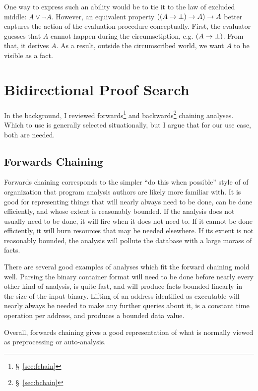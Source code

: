 One way to express such an ability would be to tie it to the law of excluded middle: $A \vee \neg A$.
However, an equivalent property $((A \rightarrow \bot) \rightarrow A) \rightarrow A$ better captures the action of the evaluation procedure conceptually.
First, the evaluator guesses that $A$ cannot happen during the circumsctiption, e.g. $(A \rightarrow \bot)$.
From that, it derives $A$.
As a result, outside the circumscribed world, we want $A$ to be visible as a fact.

\section{Bidirectional Proof Search}
In the background, I reviewed forwards\footnote{\S~\ref{sec:fchain}} and backwards\footnote{\S~\ref{sec:bchain}} chaining analyses.
Which to use is generally selected situationally, but I argue that for our use case, both are needed.
\subsection{Forwards Chaining}
Forwards chaining corresponds to the simpler ``do this when possible'' style of of organization that program analysis authors are likely more familiar with.
It is good for representing things that will nearly always need to be done,
can be done efficiently,
and whose extent is reasonably bounded.
If the analysis does not usually need to be done, it will fire when it does not need to.
If it cannot be done efficiently, it will burn resources that may be needed elsewhere.
If its extent is not reasonably bounded, the analysis will pollute the database with a large morass of facts.

There are several good examples of analyses which fit the forward chaining mold well.
Parsing the binary container format will need to be done before nearly every other kind of analysis, is quite fast, and will produce facts bounded linearly in the size of the input binary.
Lifting of an address identified as executable will nearly always be needed to make any further queries about it, is a constant time operation per address, and produces a bounded data value.

Overall, forwards chaining gives a good representation of what is normally viewed as preprocessing or auto-analysis.

